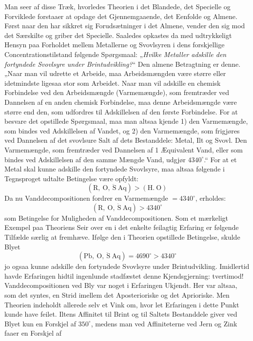 \documentclass[12pt]{book}
\newcommand{\opage}[1]{\marginnote{\footnotesize\textit{[#1]}}}
\begin{document}
Man seer af disse Træk, hvorledes Theorien i det Blandede, det Specielle og Forviklede
forstaaer at opdage det Gjennemgaaende, det Eenfolde og Almene. Først naar den har
sikkret sig Forudsætninger i det Almene, vender den sig mod det Særskilte og griber
det Specielle. Saaledes opkastes da med udtrykkeligt Hensyn paa Forholdet mellem
Metallerne og Svovlsyren i dens forskjellige Concentrationstilstand følgende
Spørgsmaal: „\emph{Hvilke Metaller adskille den fortyndede Svovlsyre under
Brintudvikling?}“ Den almene Betragtning er denne. „Naar man vil udrette et Arbeide,
maa Arbeidsmængden være større eller idetmindste ligesaa stor som Arbeidet. Naar man
vil adskille en chemisk
\opage{328} Forbindelse ved den Arbeidsmængde (Varmemængde), som fremtræder ved Dannelsen af en
anden chemisk Forbindelse, maa denne Arbeidsmængde være større end den, som udfordres
til Adskillelsen af den første Forbindelse. For at besvare det opstillede Spørgsmaal,
maa man altsaa kjende 1) den Varmemængde, som bindes ved Adskillelsen af Vandet, og 2)
den Varmemængde, som frigjøres ved Dannelsen af det svovlsure Salt af dets
Bestanddele: Metal, Ilt og Svovl. Den Varmemængde, som fremtræder ved Dannelsen af 1
Æquivalent Vand, eller som bindes ved Adskillelsen af den samme Mængde Vand, udgjør
$4340^{\circ}$.“ For at et Metal skal kunne adskille den fortyndede Svovlsyre, maa
altsaa følgende i Tegnsproget udtalte Betingelse være opfyldt:
\[ (\mathrm{R},\ \mathrm{O},\ \ddot{\mathrm{S}}\ \mathrm{Aq}) > (\mathrm{H.\ O}) \]
Da nu Vanddecompositionen fordrer en Varmemængde $= 4340^{\circ}$, erholdes:
\[ (\mathrm{R},\ \mathrm{O},\ \ddot{\mathrm{S}}\ \mathrm{Aq}) > 4340^{\circ} \]
som Betingelse for Muligheden af Vanddecompositionen. Som et mærkeligt Exempel paa
Theoriens Seir over en i det enkelte feilagtig Erfaring er følgende Tilfælde særlig at
fremhæve. Ifølge den i Theorien opstillede Betingelse, skulde Blyet
\[ (\mathrm{Pb},\ \mathrm{O},\ \ddot{\mathrm{S}}\ \mathrm{Aq}) = 4690^{\circ} > 4340^{\circ} \]
jo ogsaa kunne adskille den fortyndede Svovlsyre under Brintudvikling. Imidlertid
havde Erfaringen hidtil ingenlunde stadfæstet denne Kjendsgjerning: tvertimod!
Vanddecompositionen ved Bly var noget i Erfaringen Ukjendt. Her var altsaa, som det
syntes, en Strid imellem det Aposterioriske og det Aprioriske. Men Theorien indeholdt
allerede selv et Vink om, hvor let Erfaringen i dette Punkt kunde have feilet. Iltens
Affinitet til Brint og til Saltets Bestanddele giver ved Blyet kun en Forskjel af
$350^{\circ}$, medens man ved Affiniteterne ved Jern og Zink faaer en Forskjel af
\end{document}
